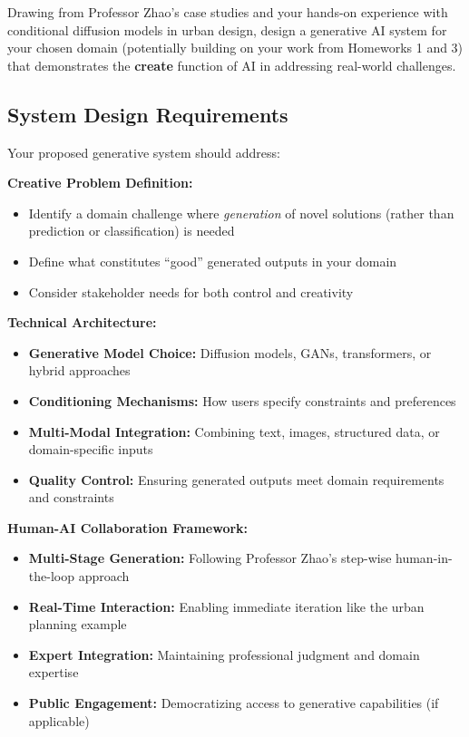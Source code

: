 \documentclass[11pt]{article}
\begin{document}
Drawing from Professor Zhao's case studies and your hands-on experience with conditional diffusion models in urban design, design a generative AI system for your chosen domain (potentially building on your work from Homeworks 1 and 3) that demonstrates the \textbf{create} function of AI in addressing real-world challenges.

\subsection*{System Design Requirements}
Your proposed generative system should address:

\noindent\textbf{Creative Problem Definition:}
\begin{itemize}
\item Identify a domain challenge where \textit{generation} of novel solutions (rather than prediction or classification) is needed
\item Define what constitutes ``good'' generated outputs in your domain
\item Consider stakeholder needs for both control and creativity
\end{itemize}

\noindent\textbf{Technical Architecture:}
\begin{itemize}
\item \textbf{Generative Model Choice:} Diffusion models, GANs, transformers, or hybrid approaches
\item \textbf{Conditioning Mechanisms:} How users specify constraints and preferences
\item \textbf{Multi-Modal Integration:} Combining text, images, structured data, or domain-specific inputs
\item \textbf{Quality Control:} Ensuring generated outputs meet domain requirements and constraints
\end{itemize}

\noindent\textbf{Human-AI Collaboration Framework:}
\begin{itemize}
\item \textbf{Multi-Stage Generation:} Following Professor Zhao's step-wise human-in-the-loop approach
\item \textbf{Real-Time Interaction:} Enabling immediate iteration like the urban planning example
\item \textbf{Expert Integration:} Maintaining professional judgment and domain expertise
\item \textbf{Public Engagement:} Democratizing access to generative capabilities (if applicable)
\end{itemize}
\end{document}
